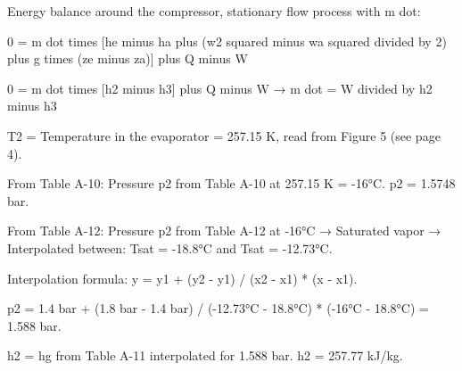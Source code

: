 Energy balance around the compressor, stationary flow process with m dot:  

0 = m dot times [he minus ha plus (w2 squared minus wa squared divided by 2) plus g times (ze minus za)] plus Q minus W  

0 = m dot times [h2 minus h3] plus Q minus W → m dot = W divided by h2 minus h3

T2 = Temperature in the evaporator = 257.15 K, read from Figure 5 (see page 4).  

From Table A-10:  
Pressure p2 from Table A-10 at 257.15 K = -16°C.  
p2 = 1.5748 bar.  

From Table A-12:  
Pressure p2 from Table A-12 at -16°C → Saturated vapor → Interpolated between:  
Tsat = -18.8°C and Tsat = -12.73°C.  

Interpolation formula:  
y = y1 + (y2 - y1) / (x2 - x1) * (x - x1).  

p2 = 1.4 bar + (1.8 bar - 1.4 bar) / (-12.73°C - 18.8°C) * (-16°C - 18.8°C) = 1.588 bar.  

h2 = hg from Table A-11 interpolated for 1.588 bar.  
h2 = 257.77 kJ/kg.